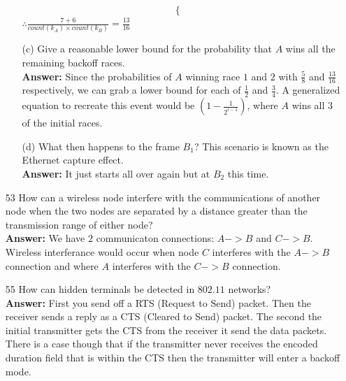 \documentclass[a4paper]{article}
\begin{document}
\begin{itemize}
\begin{itemize}
\begin{equation*}
\begin{cases}
	      	      \end{cases}
	      	\end{equation*}
	      	$\therefore \frac{7 + 6}{count(k_{A}) \times count(k_{B})} = \frac{13}{16}$
	      	\item[(c)] Give a reasonable lower bound for the probability that $A$ wins all the remaining backoff races. \\
	      	      \textbf{Answer:} Since the probabilities of $A$ winning race $1$ and $2$ with $\frac{5}{8}$ and $\frac{13}{16}$ respectively, we can grab a lower bound for each of $\frac{1}{2}$ and $\frac{3}{4}$. A generalized equation to recreate this event would be $(1 - \frac{1}{2^{i - 1}})$, where $A$ wins all $3$ of the initial races.
	      	\item[(d)] What then happens to the frame $B_{1}$? This scenario is known as the Ethernet capture effect. \\
	      	      \textbf{Answer:} It just starts all over again but at $B_{2}$ this time.
	      \end{itemize}
	\item[53] How can a wireless node interfere with the communications of another node when the two nodes are separated by a distance greater than the transmission range of either node? \\
	      \textbf{Answer:} We have $2$ communicaton connections: $A -> B$ and $C -> B$. Wireless interferance would occur when node $C$ interferes with the $A -> B$ connection and where $A$ interferes with the $C -> B$ connection.
	\item[55] How can hidden terminals be detected in $802.11$ networks? \\
	      \textbf{Answer:} First you send off a RTS (Request to Send) packet. Then the receiver sends a reply as a CTS (Cleared to Send) packet. The second the initial transmitter gets the CTS from the receiver it send the data packets. There is a case though that if the transmitter never receives the encoded duration field that is within the CTS then the transmitter will enter a backoff mode. 
\end{itemize}
\end{document}

